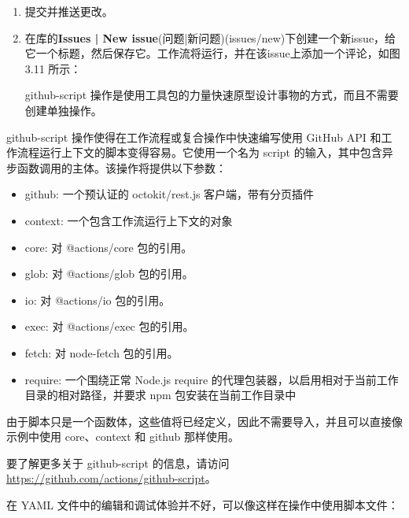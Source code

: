 \begin{enumerate}
\item 
提交并推送更改。

\item 
在库的\textbf{Issues | New issue}(问题|新问题)(issues/new)下创建一个新issue，给它一个标题，然后保存它。工作流将运行，并在该issue上添加一个评论，如图 3.11 所示：


github-script 操作是使用工具包的力量快速原型设计事物的方式，而且不需要创建单独操作。
\end{enumerate}


github-script 操作使得在工作流程或复合操作中快速编写使用 GitHub API 和工作流程运行上下文的脚本变得容易。它使用一个名为 script 的输入，其中包含异步函数调用的主体。该操作将提供以下参数：

\begin{itemize}
\item 
github: 一个预认证的 octokit/rest.js 客户端，带有分页插件

\item 
context: 一个包含工作流运行上下文的对象

\item 
core: 对 @actions/core 包的引用。

\item 
glob: 对 @actions/glob 包的引用。

\item 
io: 对 @actions/io 包的引用。

\item 
exec: 对 @actions/exec 包的引用。

\item 
fetch: 对 node-fetch 包的引用。

\item 
require: 一个围绕正常 Node.js require 的代理包装器，以启用相对于当前工作目录的相对路径，并要求 npm 包安装在当前工作目录中
\end{itemize}

由于脚本只是一个函数体，这些值将已经定义，因此不需要导入，并且可以直接像示例中使用 core、context 和 github 那样使用。

要了解更多关于 github-script 的信息，请访问 \url{https://github.com/actions/github-script}。


在 YAML 文件中的编辑和调试体验并不好，可以像这样在操作中使用脚本文件：

